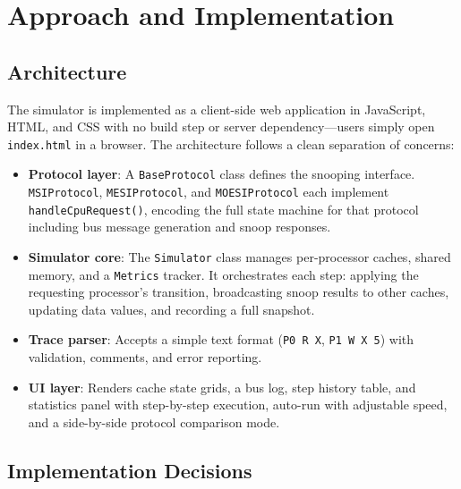 \documentclass[10pt,twocolumn]{article}
\begin{document}
\section{Approach and Implementation}

\subsection{Architecture}

The simulator is implemented as a client-side web application in JavaScript, HTML, and CSS with no build step or server dependency---users simply open \texttt{index.html} in a browser. The architecture follows a clean separation of concerns:

\begin{itemize}[nosep]
  \item \textbf{Protocol layer}: A \texttt{BaseProtocol} class defines the snooping interface. \texttt{MSIProtocol}, \texttt{MESIProtocol}, and \texttt{MOESIProtocol} each implement \texttt{handleCpuRequest()}, encoding the full state machine for that protocol including bus message generation and snoop responses.
  \item \textbf{Simulator core}: The \texttt{Simulator} class manages per-processor caches, shared memory, and a \texttt{Metrics} tracker. It orchestrates each step: applying the requesting processor's transition, broadcasting snoop results to other caches, updating data values, and recording a full snapshot.
  \item \textbf{Trace parser}: Accepts a simple text format (\texttt{P0 R X}, \texttt{P1 W X 5}) with validation, comments, and error reporting.
  \item \textbf{UI layer}: Renders cache state grids, a bus log, step history table, and statistics panel with step-by-step execution, auto-run with adjustable speed, and a side-by-side protocol comparison mode.
\end{itemize}

\subsection{Implementation Decisions}
\end{document}

